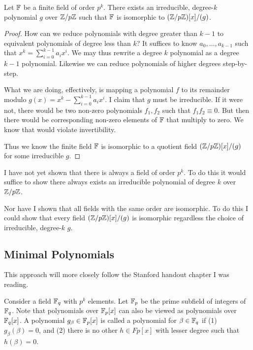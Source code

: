 \begin{theorem}
  Let $\mathbb{F}$ be a finite field of order $p^k$. There exists an
  irreducible, degree-$k$ polynomial $g$ over $\mathbb{Z} / p\mathbb{Z}$ such that $\mathbb{F}$ is
  isomorphic to $\mathopen{}\left( {\mathbb{Z} / p\mathbb{Z}} \right)\mathclose{}[x]/(g)$.
\end{theorem}

\begin{proof}
  How can we reduce polynomials with degree greater than $k-1$ to
  equivalent polynomials of degree less than $k$? It suffices to know
  $a_0, \ldots, a_{k-1}$ such that $x^k = \sum_{i=0}^{k-1} a_i x^i$. We
  may thus rewrite a degree $k$ polynomial as a degree $k-1$ polynomial.
  Likewise we can reduce polynomials of higher degrees step-by-step.

  What we are doing, effectively, is mapping a polynomial $f$ to its
  remainder modulo $g(x) = x^k - \sum_{i=0}^{k-1} a_i x^i$. I claim that
  $g$ must be irreducible. If it were not, there would be two non-zero
  polynomials $f_1, f_2$ such that $f_1 f_2 \equiv 0$. But then there
  would be corresponding non-zero elements of $\mathbb{F}$ that multiply to
  zero. We know that would violate invertibility.

  Thus we know the finite field $\mathbb{F}$ is isomorphic to a quotient field
  $\mathopen{}\left( {\mathbb{Z} / p\mathbb{Z}} \right)\mathclose{}[x]/(g)$ for some irreducible $g$.
\end{proof}

\begin{remark}
  I have not yet shown that there is always a field of order $p^k$. To
  do this it would suffice to show there always exists an irreducible
  polynomial of degree $k$ over $\mathbb{Z} / p\mathbb{Z}$.

  Nor have I shown that all fields with the same order are isomorphic.
  To do this I could show that every field $\mathopen{}\left( {\mathbb{Z} / p\mathbb{Z}} \right)\mathclose{}[x]/(g)$ is
  isomorphic regardless the choice of irreducible, degree-$k$ $g$.
\end{remark}

\subsection{Minimal Polynomials}

\begin{remark}
  This approach will more closely follow the Stanford handout chapter I
  was reading.
\end{remark}

\begin{definition}
  Consider a field $\mathbb{F}_q$ with $p^k$ elements. Let $\mathbb{F}_p$ be the prime
  subfield of integers of $\mathbb{F}_q$. Note that polynomials over $\mathbb{F}_p[x]$ can
  also be viewed as polynomials over $\mathbb{F}_q[x]$. A polynomial $g_\beta \in
  \mathbb{F}_p[x]$ is called a  polynomial for $\beta \in \mathbb{F}_q$ if
  (1) $g_\beta(\beta) = 0$, and (2) there is no other $h \in Fp[x]$ with
  lesser degree such that $h(\beta) = 0$.
\end{definition}

